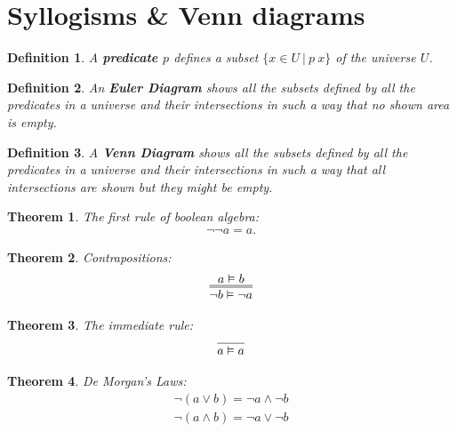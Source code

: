 \documentclass{article}
\theoremstyle{sltheorem}
\newtheorem{definition}{Definition}
\newtheorem{theorem}{Theorem}
\begin{document}
\section{Syllogisms \& Venn diagrams}
\begin{definition}
    A \textbf{predicate $p$} defines a subset $\{x\in U\:|\:p\:x\}$ of the universe $U$.
\end{definition}
\begin{definition}
    An \textbf{Euler Diagram} shows all the subsets defined by all the predicates in a universe and their intersections in such a way that no shown area is empty.
\end{definition}
\begin{definition}
    A \textbf{Venn Diagram} shows all the subsets defined by all the predicates in a universe and their intersections in such a way that all intersections are shown but they might be empty.
\end{definition}
\begin{theorem}
    The first rule of boolean algebra:
    \begin{gather*}
        \neg\neg a = a.
    \end{gather*}
\end{theorem}
\begin{theorem}
    Contrapositions:
    \begin{gather*}
        \infer={\neg b\vDash\neg a}{a\vDash b}
    \end{gather*}
\end{theorem}
\begin{theorem}
    The immediate rule:
    \begin{gather*}
        \infer{a\vDash a}{}
    \end{gather*}
\end{theorem}
\begin{theorem}
    De Morgan's Laws:
    \begin{gather*}
        \neg(a\vee b) = \neg a \wedge \neg b\\
        \neg(a\wedge b) = \neg a \vee \neg b
    \end{gather*}
\end{theorem}
\end{document}
